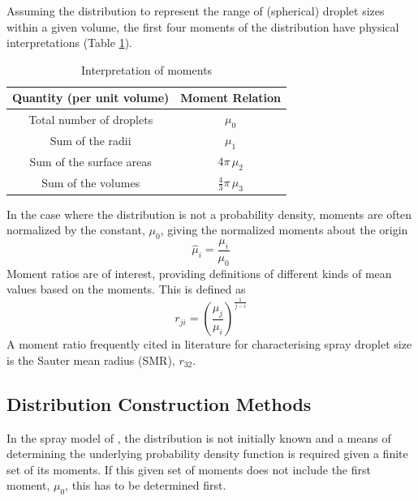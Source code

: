\documentclass[a4paper,10pt]{article}
\begin{document}
Assuming the distribution to represent the range of (spherical) droplet sizes within a given volume, the first four moments of the distribution have physical interpretations (Table \ref{tab:mom_interpre}).
\begin{table}[ht]
\caption{Interpretation of moments}
\vspace{2mm}
\centering
\begin{tabular}{c | c}
\hline \hline
Quantity (per unit volume) & Moment Relation \\
\hline
Total number of droplets & $\mu_{0}$ \\
Sum of the radii & $\mu_{1}$ \\
Sum of the surface areas & $4 \pi \, \mu_{2}$ \\
Sum of the volumes & $\frac{4}{3} \pi \, \mu_{3}$
\end{tabular}
\label{tab:mom_interpre}
\end{table}
%
In the case where the distribution is not a probability density, moments are often normalized by the constant, $\mu_0$, giving the normalized moments about the origin
\begin{equation}
\hat{\mu}_i = \frac{\mu_i}{\mu_0}
\end{equation}
%
Moment ratios are of interest, providing definitions of different kinds of mean values based on the moments.  This is defined as
\begin{equation} \label{eqn:mom_ratio}
r_{ji} = \left(\frac{\mu_j}{\mu_i}\right)^{\frac{1}{j-i}}
\end{equation}
A moment ratio frequently cited in literature for characterising spray droplet size is the Sauter mean radius (SMR), $r_{32}$.



\subsection{Distribution Construction Methods}
In the spray model of \cite{beck2003}, the distribution is not initially known and a means of determining the underlying probability density function is required given a finite set of its moments. If this given set of moments does not include the first moment, $\mu_0$, this has to be determined first.
\end{document}
